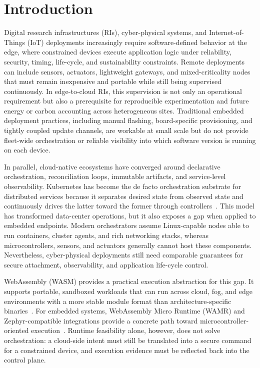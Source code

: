\section{Introduction}\label{sec:introduction}

Digital research infrastructures (RIs), cyber-physical systems, and Internet-of-Things (IoT) deployments increasingly require software-defined behavior at the edge, where constrained devices execute application logic under reliability, security, timing, life-cycle, and sustainability constraints. Remote deployments can include sensors, actuators, lightweight gateways, and mixed-criticality nodes that must remain inexpensive and portable while still being supervised continuously. In edge-to-cloud RIs, this supervision is not only an operational requirement but also a prerequisite for reproducible experimentation and future energy or carbon accounting across heterogeneous sites. Traditional embedded deployment practices, including manual flashing, board-specific provisioning, and tightly coupled update channels, are workable at small scale but do not provide fleet-wide orchestration or reliable visibility into which software version is running on each device.

In parallel, cloud-native ecosystems have converged around declarative orchestration, reconciliation loops, immutable artifacts, and service-level observability. Kubernetes has become the de facto orchestration substrate for distributed services because it separates desired state from observed state and continuously drives the latter toward the former through controllers~\cite{kubernetes}. This model has transformed data-center operations, but it also exposes a gap when applied to embedded endpoints. Modern orchestrators assume Linux-capable nodes able to run containers, cluster agents, and rich networking stacks, whereas microcontrollers, sensors, and actuators generally cannot host these components. Nevertheless, cyber-physical deployments still need comparable guarantees for secure attachment, observability, and application life-cycle control.

WebAssembly (WASM) provides a practical execution abstraction for this gap. It supports portable, sandboxed workloads that can run across cloud, fog, and edge environments with a more stable module format than architecture-specific binaries~\cite{haas_wasm}. For embedded systems, WebAssembly Micro Runtime (WAMR) and Zephyr-compatible integrations provide a concrete path toward microcontroller-oriented execution~\cite{wamr,zephyr}. Runtime feasibility alone, however, does not solve orchestration: a cloud-side intent must still be translated into a secure command for a constrained device, and execution evidence must be reflected back into the control plane.

